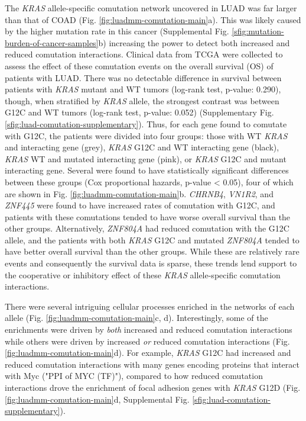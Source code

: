 \documentclass[english, 10pt, letterpaper]{article}
\newcommand{\KRAS}{\emph{KRAS}}
\begin{document}
The \KRAS{} allele-specific comutation network uncovered in LUAD was far larger than that of COAD (Fig. \ref{fig:luadmm-comutation-main}a).
This was likely caused by the higher mutation rate in this cancer (Supplemental Fig. \ref{sfig:mutation-burden-of-cancer-samples}b) increasing the power to detect both increased and reduced comutation interactions.
Clinical data from TCGA \cite{CancerGenomeAtlasResearchNetwork2014} were collected to assess the effect of these comutation events on the overall survival (OS) of patients with LUAD.
There was no detectable difference in survival between patients with \KRAS{} mutant and WT tumors (log-rank test, p-value: 0.290), though, when stratified by \KRAS{} allele, the strongest contrast was between G12C and WT tumors (log-rank test, p-value: 0.052) (Supplementary Fig. \ref{sfig:luad-comutation-supplementary}).
Thus, for each gene found to comutate with G12C, the patients were divided into four groups: those with WT \KRAS{} and interacting gene (grey), \KRAS{} G12C and WT interacting gene (black), \KRAS{} WT and mutated interacting gene (pink), or \KRAS{} G12C and mutant interacting gene.
Several were found to have statistically significant differences between these groups (Cox proportional hazards, p-value < 0.05), four of which are shown in Fig. \ref{fig:luadmm-comutation-main}b.
\emph{CHRNB4}, \emph{VN1R2}, and \emph{ZNF445} were found to have increased rates of comutation with G12C, and patients with these comutations tended to have worse overall survival than the other groups.
Alternatively, \emph{ZNF804A} had reduced comutation with the G12C allele, and the patients with both \KRAS{} G12C and mutated \emph{ZNF804A} tended to have better overall survival than the other groups.
While these are relatively rare events and consequently the survival data is sparse, these trends lend support to the cooperative or inhibitory effect of these \KRAS{} allele-specific comutation interactions.

There were several intriguing cellular processes enriched in the networks of each allele (Fig. \ref{fig:luadmm-comutation-main}c, d).
Interestingly, some of the enrichments were driven by \emph{both} increased and reduced comutation interactions while others were driven by increased \emph{or} reduced comutation interactions (Fig. \ref{fig:luadmm-comutation-main}d).
For example, \KRAS{} G12C had increased and reduced comutation interactions with many genes encoding proteins that interact with Myc ("PPI of MYC (TF)"), compared to how reduced comutation interactions drove the enrichment of focal adhesion genes with \KRAS{} G12D (Fig. \ref{fig:luadmm-comutation-main}d, Supplemental Fig. \ref{sfig:luad-comutation-supplementary}).
\end{document}
